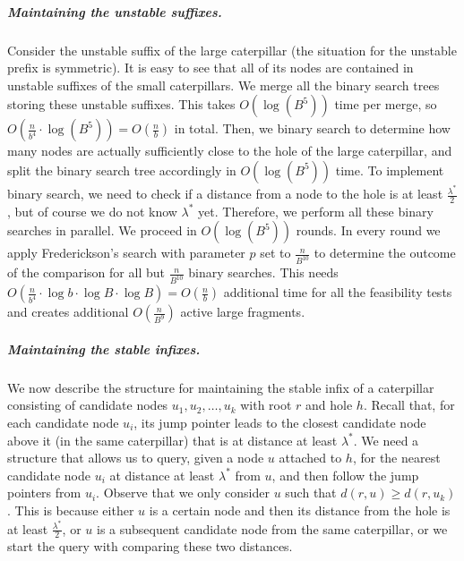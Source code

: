\documentclass[a4paper,UKenglish]{lipics-v2016}
\theoremstyle{plain}
\renewcommand{\paragraph}{\subparagraph}
\begin{document}
\paragraph{Maintaining the unstable suffixes.}
Consider the unstable suffix of the large caterpillar (the situation for the unstable prefix is
symmetric). It is easy to see that all of its nodes are contained in unstable suffixes of
the small caterpillars. We merge all the binary search trees storing these unstable suffixes.
This takes $O(\log (B^5))$ time per merge, so $O(\frac{n}{b^{4}}\cdot \log (B^5))=O(\frac{n}{b})$ in total.
Then, we binary search to determine how many nodes are actually sufficiently close to the hole of the large caterpillar, and
 split the binary search tree accordingly in $O(\log (B^{5}))$ time. To implement binary search, we need to
check if a distance from a node to the hole is at least $\frac{\lambda^{*}}{2}$, but of course we
do not know $\lambda^{*}$ yet. Therefore, we perform all these binary searches in parallel. We proceed in $O(\log (B^{5}))$ rounds. In every round we apply Frederickson's search
with parameter $p$ set to $\frac{n}{B^{10}}$ to determine  the outcome of the comparison for all
but $\frac{n}{B^{10}}$ binary searches. This needs
$O(\frac{n}{b^{4}}\cdot\log b\cdot\log B\cdot\log B)=O(\frac{n}{b})$ additional time for
all the feasibility tests and creates additional $O(\frac{n}{B^{9}})$ active large fragments.

\paragraph{Maintaining the stable infixes.}
We now describe the structure for maintaining the stable infix of a caterpillar consisting of candidate nodes $u_{1},u_{2},\ldots,u_{k}$ with root $r$ and hole $h$. 
Recall that, for each candidate node $u_i$, its jump pointer leads to the closest candidate node above it (in the same caterpillar) that is at distance at least $\lambda ^*$. 
We need a structure that allows us to query, given a node $u$ attached to $h$, for the nearest candidate node $u_{i}$ at distance at least $\lambda^{*}$ from $u$, and then follow the jump pointers from $u_{i}$.
%
Observe that we only consider $u$ such that $d(r,u)\geq d(r,u_{k})$. This is because either $u$ is a certain node and then its distance from the hole is at least
$\frac{\lambda^{*}}{2}$, or $u$ is a subsequent candidate node from the same caterpillar,
or we start the query with comparing these two distances.
\end{document}
